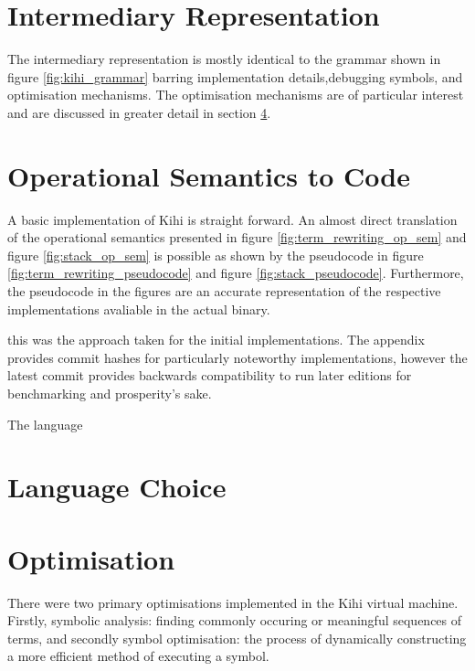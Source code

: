 \section{Intermediary Representation}\label{sec:implementation_intermediary_representation}
The intermediary representation is mostly identical to the grammar shown in figure \ref{fig:kihi_grammar} barring implementation details,debugging symbols, and optimisation mechanisms. The optimisation mechanisms are of particular interest and are discussed in greater detail in section \ref{sec:implementation_optimisation}.

\section{Operational Semantics to Code}
A basic implementation of Kihi is straight forward. An almost direct translation of the operational semantics presented in figure \ref{fig:term_rewriting_op_sem} and figure \ref{fig:stack_op_sem} is possible as shown by the pseudocode in figure \ref{fig:term_rewriting_pseudocode} and figure \ref{fig:stack_pseudocode}. Furthermore, the pseudocode in the figures are an accurate representation of the respective implementations avaliable in the actual binary.



this was the approach taken for the initial implementations. The appendix provides commit hashes for particularly noteworthy implementations, however the latest commit provides backwards compatibility to run later editions for benchmarking and prosperity's sake.

The language




\section{Language Choice}

\section{Optimisation}\label{sec:implementation_optimisation}
There were two primary optimisations implemented in the Kihi virtual
machine. Firstly, symbolic analysis: finding commonly occuring or
meaningful sequences of terms, and secondly symbol optimisation: the
process of dynamically constructing a more efficient method of executing
a symbol. 

